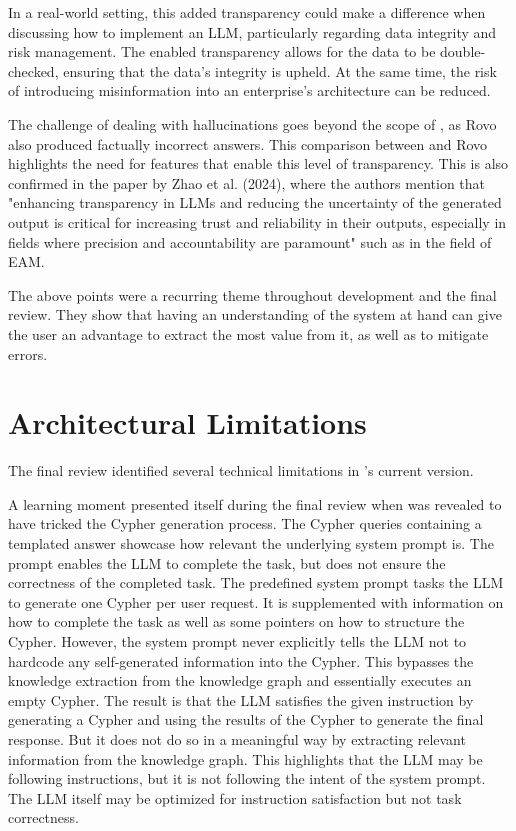 In a real-world setting, this added transparency could make a difference when discussing how to implement an LLM, particularly regarding data integrity and risk management. The enabled transparency allows for the data to be double-checked, ensuring that the data's integrity is upheld. At the same time, the risk of introducing misinformation into an enterprise's architecture can be reduced.

The challenge of dealing with hallucinations goes beyond the scope of \prototype{}, as Rovo also produced factually incorrect answers. This comparison between \prototype{} and Rovo highlights the need for features that enable this level of transparency. This is also confirmed in the paper by Zhao et al. (2024), where the authors mention that "enhancing transparency in LLMs and reducing the uncertainty of the generated output is critical for increasing trust and reliability in their outputs, especially in fields where precision and accountability are paramount"\cite{zhao2024retrieval} such as in the field of EAM.

The above points were a recurring theme throughout development and the final review. They show that having an understanding of the system at hand can give the user an advantage to extract the most value from it, as well as to mitigate errors.

\section{Architectural Limitations}
\label{sub:architecturalLimitations}
The final review identified several technical limitations in \prototype{}'s current version.

A learning moment presented itself during the final review when \prototype{} was revealed to have tricked the Cypher generation process. The Cypher queries containing a templated answer showcase how relevant the underlying system prompt is. The prompt enables the LLM to complete the task, but does not ensure the correctness of the completed task. The predefined system prompt tasks the LLM to generate one Cypher per user request. It is supplemented with information on how to complete the task as well as some pointers on how to structure the Cypher. However, the system prompt never explicitly tells the LLM not to hardcode any self-generated information into the Cypher. This bypasses the knowledge extraction from the knowledge graph and essentially executes an empty Cypher. The result is that the LLM satisfies the given instruction by generating a Cypher and using the results of the Cypher to generate the final response. But it does not do so in a meaningful way by extracting relevant information from the knowledge graph. This highlights that the LLM may be following instructions, but it is not following the intent of the system prompt. The LLM itself may be optimized for instruction satisfaction but not task correctness.

